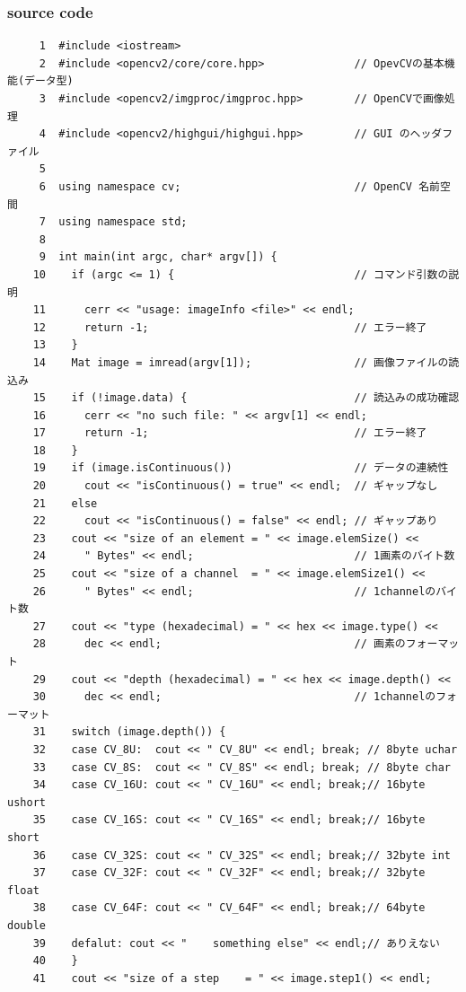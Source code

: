 \documentclass{jsarticle}
\begin{document}
\subsubsection{source code}
\begin{verbatim}
     1	#include <iostream>
     2	#include <opencv2/core/core.hpp>              // OpevCVの基本機能(データ型)
     3	#include <opencv2/imgproc/imgproc.hpp>        // OpenCVで画像処理
     4	#include <opencv2/highgui/highgui.hpp>        // GUI のヘッダファイル
     5	
     6	using namespace cv;                           // OpenCV 名前空間
     7	using namespace std;
     8	
     9	int main(int argc, char* argv[]) {
    10	  if (argc <= 1) {                            // コマンド引数の説明
    11	    cerr << "usage: imageInfo <file>" << endl;
    12	    return -1;                                // エラー終了
    13	  }
    14	  Mat image = imread(argv[1]);                // 画像ファイルの読込み
    15	  if (!image.data) {                          // 読込みの成功確認
    16	    cerr << "no such file: " << argv[1] << endl;
    17	    return -1;                                // エラー終了
    18	  }
    19	  if (image.isContinuous())                   // データの連続性
    20	    cout << "isContinuous() = true" << endl;  // ギャップなし
    21	  else
    22	    cout << "isContinuous() = false" << endl; // ギャップあり
    23	  cout << "size of an element = " << image.elemSize() <<
    24	    " Bytes" << endl;                         // 1画素のバイト数
    25	  cout << "size of a channel  = " << image.elemSize1() <<
    26	    " Bytes" << endl;                         // 1channelのバイト数
    27	  cout << "type (hexadecimal) = " << hex << image.type() <<
    28	    dec << endl;                              // 画素のフォーマット
    29	  cout << "depth (hexadecimal) = " << hex << image.depth() <<
    30	    dec << endl;                              // 1channelのフォーマット
    31	  switch (image.depth()) {
    32	  case CV_8U:  cout << " CV_8U" << endl; break; // 8byte uchar
    33	  case CV_8S:  cout << " CV_8S" << endl; break; // 8byte char
    34	  case CV_16U: cout << " CV_16U" << endl; break;// 16byte ushort
    35	  case CV_16S: cout << " CV_16S" << endl; break;// 16byte short
    36	  case CV_32S: cout << " CV_32S" << endl; break;// 32byte int
    37	  case CV_32F: cout << " CV_32F" << endl; break;// 32byte float
    38	  case CV_64F: cout << " CV_64F" << endl; break;// 64byte double
    39	  defalut: cout << "    something else" << endl;// ありえない
    40	  }
    41	  cout << "size of a step    = " << image.step1() << endl;

\end{verbatim}
\end{document}
